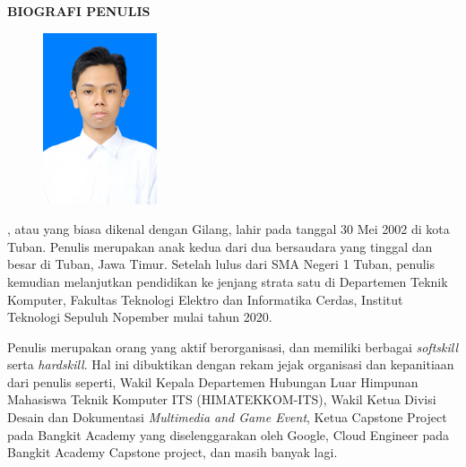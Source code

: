 \begin{center}
  \Large
  \textbf{BIOGRAFI PENULIS}
\end{center}


\vspace{2ex}

\begin{figure}
  \centering
  \vspace{-3ex}
  \includegraphics[width=0.3\textwidth]{gambar/biografi/gilang.jpg}
  \vspace{-4ex}
\end{figure}

\name{}, atau yang biasa dikenal dengan Gilang, lahir pada tanggal 30 Mei 2002 di kota Tuban. Penulis merupakan anak kedua dari dua bersaudara yang tinggal dan besar di Tuban, Jawa Timur. Setelah lulus dari SMA Negeri 1 Tuban, penulis kemudian melanjutkan pendidikan ke jenjang strata satu di Departemen Teknik Komputer, Fakultas Teknologi Elektro dan Informatika Cerdas, Institut Teknologi Sepuluh Nopember mulai tahun 2020.

Penulis merupakan orang yang aktif berorganisasi, dan memiliki berbagai \emph{softskill} serta \emph{hardskill}. Hal ini dibuktikan dengan rekam jejak organisasi dan kepanitiaan dari penulis seperti, Wakil Kepala Departemen Hubungan Luar Himpunan Mahasiswa Teknik Komputer ITS (HIMATEKKOM-ITS), Wakil Ketua Divisi Desain dan Dokumentasi \emph{Multimedia and Game Event}, Ketua Capstone Project pada Bangkit Academy yang diselenggarakan oleh Google, Cloud Engineer pada Bangkit Academy Capstone project, dan masih banyak lagi.